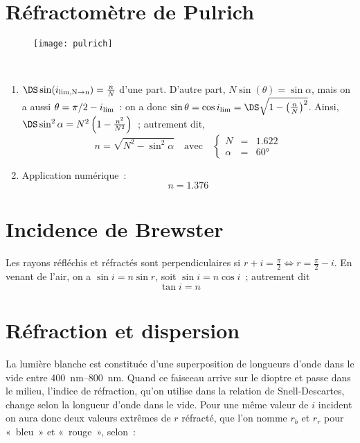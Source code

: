 \documentclass[a4paper, 12pt, final, garamond]{book}
\begin{document}
\section{Réfractomètre de Pulrich}
\begin{wrapfigure}[6]{R}{.3\linewidth}
    \vspace*{20pt}
    \centering
    \texttt{[image: pulrich]}
    \label{fig:pulrich_plain}
\end{wrapfigure}
~
\begin{enumerate}
    \item $\DS \sin(i_{\rm lim, N\rightarrow n}) = \frac{n}{N}$ d'une part. D'autre
        part, $N\sin(\theta) = \sin\alpha$, mais on a aussi $\theta = \pi/2 -
        i_{\rm lim}$~: on a donc $\sin\theta = \cos i_{\rm lim} = \DS \sqrt{1-
        \left(\frac{n}{N}\right)^2}$. Ainsi, $\DS\sin^2\alpha = N^2 \left( 1 -
    \frac{n^2}{N^2} \right)$~; autrement dit,
    \begin{equation*}
        \boxed{n = \sqrt{N^2 - \sin^2\alpha}}
        \quad\text{avec}\quad
        \left\{
            \begin{array}{rcl}
                N & = & \num{1.622}\\
                \alpha & = & \ang{60;;}
            \end{array}
        \right.
    \end{equation*}
    \item Application numérique~:
        \[\boxed{n = \num{1.376}}\]
\end{enumerate}

\section{Incidence de Brewster}

Les rayons réfléchis et réfractés sont perpendiculaires si $r+i =
\frac{\pi}{2} \Leftrightarrow r = \frac{\pi}{2} -i$. En venant de l'air, on a
$\sin i = n\sin r$, soit $\sin i = n\cos i$~; autrement dit
\begin{equation*}
    \boxed{\tan i = n}
\end{equation*}

\section{Réfraction et dispersion}

La lumière blanche est constituée d'une superposition de longueurs d'onde dans
le vide entre \SIrange{400}{800}{nm}. Quand ce faisceau arrive sur
le dioptre et passe dans le milieu, l'indice de réfraction, qu'on utilise dans
la relation de Snell-Descartes, change selon la longueur d'onde dans le vide.
Pour une même valeur de $i$ incident on aura donc deux valeurs extrêmes de $r$
réfracté, que l'on nomme $r_b$ et $r_r$ pour «~bleu~» et «~rouge~», selon~:
\end{document}
